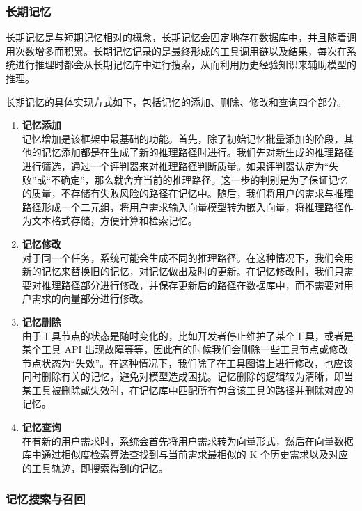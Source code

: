 \subsubsection{长期记忆}

长期记忆是与短期记忆相对的概念，长期记忆会固定地存在数据库中，并且随着调用次数增多而积累。长期记忆记录的是最终形成的工具调用链以及结果，每次在系统进行推理时都会从长期记忆库中进行搜索，从而利用历史经验知识来辅助模型的推理。

长期记忆的具体实现方式如下，包括记忆的添加、删除、修改和查询四个部分。

\begin{enumerate}
    \item \textbf{记忆添加} \\
    记忆增加是该框架中最基础的功能。首先，除了初始记忆批量添加的阶段，其他的记忆添加都是在生成了新的推理路径时进行。我们先对新生成的推理路径进行筛选，通过一个评判器来对推理路径判断质量。如果评判器认定为“失败”或“不确定”，那么就舍弃当前的推理路径。这一步的判别是为了保证记忆的质量，不存储有失败风险的路径在记忆中。随后，我们将用户的需求与推理路径形成一个二元组，将用户需求输入向量模型转为嵌入向量，将推理路径作为文本格式存储，方便计算和检索记忆。

    \item \textbf{记忆修改} \\
    对于同一个任务，系统可能会生成不同的推理路径。在这种情况下，我们会用新的记忆来替换旧的记忆，对记忆做出及时的更新。在记忆修改时，我们只需要对推理路径部分进行修改，并保存更新后的路径在数据库中，而不需要对用户需求的向量部分进行修改。

    \item \textbf{记忆删除} \\
    由于工具节点的状态是随时变化的，比如开发者停止维护了某个工具，或者是某个工具 API 出现故障等等，因此有的时候我们会删除一些工具节点或修改节点状态为“失效”。在这种情况下，我们除了在工具图谱上进行修改，也应该同时删除有关的记忆，避免对模型造成困扰。记忆删除的逻辑较为清晰，即当某工具被删除或失效时，在记忆库中匹配所有包含该工具的路径并删除对应的记忆。

    \item \textbf{记忆查询} \\
    在有新的用户需求时，系统会首先将用户需求转为向量形式，然后在向量数据库中通过相似度检索算法查找到与当前需求最相似的 K 个历史需求以及对应的工具轨迹，即搜索得到的记忆。
\end{enumerate}

\subsubsection{记忆搜索与召回}
